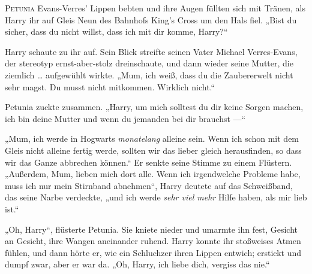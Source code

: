 \lettrine{P}{etunia} Evans-Verres’ Lippen bebten und ihre Augen füllten sich mit Tränen, als Harry ihr auf Gleis Neun des Bahnhofs King’s Cross um den Hals fiel.
„Bist du sicher, dass du nicht willst, dass ich mit dir komme, Harry?“

Harry schaute zu ihr auf. Sein Blick streifte seinen Vater Michael Verres-Evans, der stereotyp ernst-aber-stolz dreinschaute, und dann wieder seine Mutter, die ziemlich … aufgewühlt wirkte.
„Mum, ich weiß, dass du die Zaubererwelt nicht sehr magst. Du musst nicht mitkommen. Wirklich nicht.“

Petunia zuckte zusammen.
„Harry, um mich solltest du dir keine Sorgen machen, ich bin deine Mutter und wenn du jemanden bei dir brauchst —“

„Mum, ich werde in Hogwarts \emph{monatelang} alleine sein. Wenn ich schon mit dem Gleis nicht alleine fertig werde, sollten wir das lieber gleich herausfinden, so dass wir das Ganze abbrechen können.“ Er senkte seine Stimme zu einem Flüstern.
„Außerdem, Mum, lieben mich dort alle. Wenn ich irgendwelche Probleme habe, muss ich nur mein Stirnband abnehmen“, Harry deutete auf das Schweißband, das seine Narbe verdeckte, „und ich werde \emph{sehr viel mehr} Hilfe haben, als mir lieb ist.“

„Oh, Harry“, flüsterte Petunia. Sie kniete nieder und umarmte ihn fest, Gesicht an Gesicht, ihre Wangen aneinander ruhend. Harry konnte ihr stoßweises Atmen fühlen, und dann hörte er, wie ein Schluchzer ihren Lippen entwich; erstickt und dumpf zwar, aber er war da.
„Oh, Harry, ich liebe dich, vergiss das nie.“

